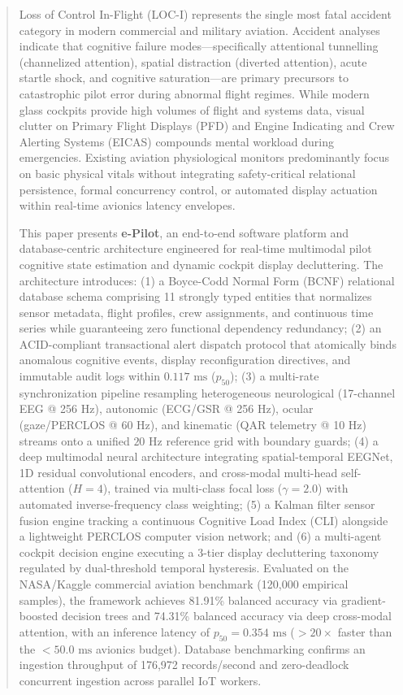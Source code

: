 \documentclass[journal]{IEEEtran}
\begin{document}
\begin{abstract}
Loss of Control In-Flight (LOC-I) represents the single most fatal accident category in modern commercial and military aviation. Accident analyses indicate that cognitive failure modes---specifically attentional tunnelling (channelized attention), spatial distraction (diverted attention), acute startle shock, and cognitive saturation---are primary precursors to catastrophic pilot error during abnormal flight regimes. While modern glass cockpits provide high volumes of flight and systems data, visual clutter on Primary Flight Displays (PFD) and Engine Indicating and Crew Alerting Systems (EICAS) compounds mental workload during emergencies. Existing aviation physiological monitors predominantly focus on basic physical vitals without integrating safety-critical relational persistence, formal concurrency control, or automated display actuation within real-time avionics latency envelopes.

This paper presents \textbf{e-Pilot}, an end-to-end software platform and database-centric architecture engineered for real-time multimodal pilot cognitive state estimation and dynamic cockpit display decluttering. The architecture introduces: (1) a Boyce-Codd Normal Form (BCNF) relational database schema comprising 11 strongly typed entities that normalizes sensor metadata, flight profiles, crew assignments, and continuous time series while guaranteeing zero functional dependency redundancy; (2) an ACID-compliant transactional alert dispatch protocol that atomically binds anomalous cognitive events, display reconfiguration directives, and immutable audit logs within $0.117\text{ ms}$ ($p_{50}$); (3) a multi-rate synchronization pipeline resampling heterogeneous neurological (17-channel EEG @ 256 Hz), autonomic (ECG/GSR @ 256 Hz), ocular (gaze/PERCLOS @ 60 Hz), and kinematic (QAR telemetry @ 10 Hz) streams onto a unified $20\text{ Hz}$ reference grid with boundary guards; (4) a deep multimodal neural architecture integrating spatial-temporal EEGNet, 1D residual convolutional encoders, and cross-modal multi-head self-attention ($H=4$), trained via multi-class focal loss ($\gamma=2.0$) with automated inverse-frequency class weighting; (5) a Kalman filter sensor fusion engine tracking a continuous Cognitive Load Index (CLI) alongside a lightweight PERCLOS computer vision network; and (6) a multi-agent cockpit decision engine executing a 3-tier display decluttering taxonomy regulated by dual-threshold temporal hysteresis. Evaluated on the NASA/Kaggle commercial aviation benchmark (120,000 empirical samples), the framework achieves 81.91\% balanced accuracy via gradient-boosted decision trees and 74.31\% balanced accuracy via deep cross-modal attention, with an inference latency of $p_{50}=0.354\text{ ms}$ ($>20\times$ faster than the $<50.0\text{ ms}$ avionics budget). Database benchmarking confirms an ingestion throughput of 176,972 records/second and zero-deadlock concurrent ingestion across parallel IoT workers.
\end{abstract}
\end{document}
